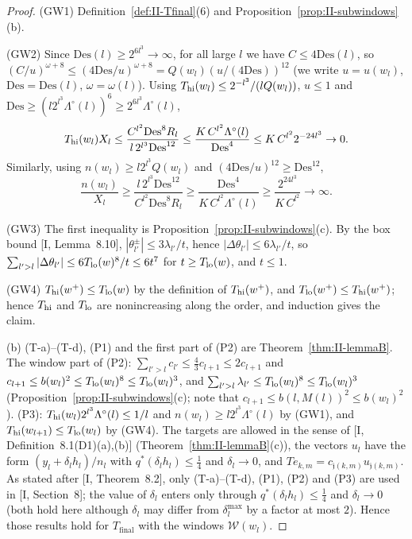 \documentclass[10pt]{amsart}
\theoremstyle{definition}
\theoremstyle{remark}
\begin{document}
\begin{proof}
(GW1) Definition~\ref{def:II-Tfinal}(6) and
Proposition~\ref{prop:II-subwindows}(b).

(GW2) Since $\mathrm{Des}(l)\ge2^{6l^3}\to\infty$, for all large $l$ we
have $C\le4\mathrm{Des}(l)$, so $(C/u)^{\omega+8}\le(4\mathrm{Des}/u)^{\omega
+8}=Q(w_l)(u/(4\mathrm{Des}))^{12}$ (we write $u=u(w_l)$,
$\mathrm{Des}=\mathrm{Des}(l)$, $\omega=\omega(l)$).  Using $T_{\rm hi}
(w_l)\le2^{-l^3}/(lQ(w_l))$, $u\le1$ and $\mathrm{Des}\ge(l2^{l^3}
\Lambda^\circ(l))^6\ge2^{6l^3}\Lambda^\circ(l)$,
\[
 T_{\rm hi}(w_l)X_l\le\frac{C^{l^2}\mathrm{Des}^8R_l}{l\,2^{l^3}
 \mathrm{Des}^{12}}\le\frac{K\,C^{l^2}\Lambda^\circ(l)}{\mathrm{Des}^4}\le
 K\,C^{l^2}2^{-24l^3}\to0 .
\]
Similarly, using $n(w_l)\ge l2^{l^3}Q(w_l)$ and $(4\mathrm{Des}/u)^{12}\ge
\mathrm{Des}^{12}$,
\[
 \frac{n(w_l)}{X_l}\ge\frac{l\,2^{l^3}\mathrm{Des}^{12}}{C^{l^2}
 \mathrm{Des}^8R_l}\ge\frac{\mathrm{Des}^4}{K\,C^{l^2}\Lambda^\circ(l)}\ge
 \frac{2^{24l^3}}{K\,C^{l^2}}\to\infty .
\]

(GW3) The first inequality is Proposition~\ref{prop:II-subwindows}(c).
By the box bound [I, Lemma~8.10], $|\theta^\pm_{l'}|\le3\lambda_{l'}/t$,
hence $|\Delta\theta_{l'}|\le6\lambda_{l'}/t$, so $\sum_{l'>l}|\Delta\theta_{l'}|\le6T_{\rm lo}(w)^8/t
\le6t^7$ for $t\ge T_{\rm lo}(w)$, and $t\le1$.

(GW4) $T_{\rm hi}(w^+)\le T_{\rm lo}(w)$ by the definition of
$T_{\rm hi}(w^+)$, and $T_{\rm lo}(w^+)\le T_{\rm hi}(w^+)$; hence
$T_{\rm hi}$ and $T_{\rm lo}$ are nonincreasing along the order, and
induction gives the claim.

(b) (T-a)--(T-d), (P1) and the first part of (P2) are
Theorem~\ref{thm:II-lemmaB}.  The window part of (P2):
$\sum_{l'>l}c_{l'}\le\frac43c_{l+1}\le2c_{l+1}$ and $c_{l+1}\le
b(w_l)^2\le T_{\rm lo}(w_l)^8\le T_{\rm lo}(w_l)^3$, and
$\sum_{l'>l}\lambda_{l'}\le T_{\rm lo}(w_l)^8\le T_{\rm lo}(w_l)^3$
(Proposition~\ref{prop:II-subwindows}(c); note that $c_{l+1}\le
b(l,M(l))^2\le b(w_l)^2$).  (P3): $T_{\rm hi}(w_l)2^{l^3}\Lambda^\circ(l)
\le1/l$ and $n(w_l)\ge l2^{l^3}\Lambda^\circ(l)$ by (GW1), and
$T_{\rm hi}(w_{l+1})\le T_{\rm lo}(w_l)$ by (GW4).  The targets are
allowed in the sense of [I, Definition~8.1(D1)(a),(b)]
(Theorem~\ref{thm:II-lemmaB}(c)), the vectors $u_l$ have the form
$(y_l+\delta_lh_l)/n_l$ with $q^*(\delta_lh_l)\le\frac14$ and
$\delta_l\to0$, and $Te_{k,m}=c_{\mathfrak j(k,m)}u_{\mathfrak j(k,m)}$.  As
stated after [I, Theorem~8.2], only (T-a)--(T-d), (P1), (P2) and
(P3) are used in [I, Section~8]; the value of $\delta_l$ enters
only through $q^*(\delta_lh_l)\le\frac14$ and $\delta_l\to0$ (both hold
here although $\delta_l$ may differ from $\delta^{\max}_l$ by a factor at
most $2$).  Hence those results hold for $T_{\mathrm{final}}$ with the
windows $\mathcal W(w_l)$.
\end{proof}
\end{document}
